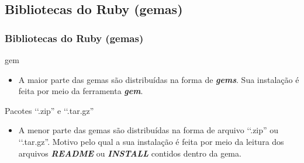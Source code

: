 \subsection{Bibliotecas do Ruby (gemas)} 
\begin{frame}
 \frametitle{Bibliotecas do Ruby (gemas)}

  \begin{block}{gem}
  
   \begin{itemize}
   
    \item A maior parte das gemas são distribuídas na forma de \emph{\textbf{gems}}. Sua instalação é feita por
    meio da ferramenta \emph{\textbf{gem}}.    
    
   \end{itemize}
    
  \end{block}
  
    \begin{block}{Pacotes ‘‘.zip'' e ‘‘.tar.gz''}
  
   \begin{itemize}   
    
    \item A menor parte das gemas são distribuídas na forma de arquivo ‘‘.zip'' ou ‘‘.tar.gz''. Motivo pelo qual
    a sua instalação é feita por meio da leitura dos arquivos \emph{\textbf{README}} ou \emph{\textbf{INSTALL}} 
    contidos dentro da gema.
    
   \end{itemize}
    
  \end{block}
  
\end{frame}  


